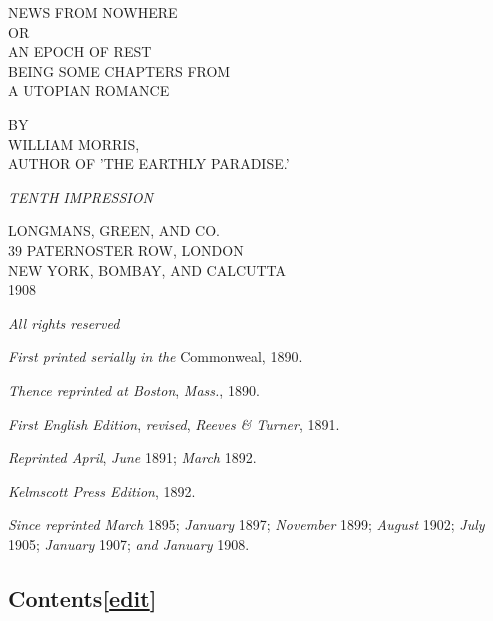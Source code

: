 NEWS FROM NOWHERE\\
OR\\
AN EPOCH OF REST\\
BEING SOME CHAPTERS FROM\\
A UTOPIAN ROMANCE

BY\\
WILLIAM MORRIS,\\
AUTHOR OF 'THE EARTHLY PARADISE.'

\emph{TENTH IMPRESSION}

LONGMANS, GREEN, AND CO.\\
39 PATERNOSTER ROW, LONDON\\
NEW YORK, BOMBAY, AND CALCUTTA\\
1908

\emph{All rights reserved}

\emph{First printed serially in the} Commonweal, 1890.

\emph{Thence reprinted at Boston}, \emph{Mass.}, 1890.

\emph{First English Edition}, \emph{revised}, \emph{Reeves \& Turner},
1891.

\emph{Reprinted April}, \emph{June} 1891; \emph{March} 1892.

\emph{Kelmscott Press Edition}, 1892.

\emph{Since reprinted March} 1895; \emph{January} 1897; \emph{November}
1899; \emph{August} 1902; \emph{July} 1905; \emph{January} 1907;
\emph{and January} 1908.

\hypertarget{contentsedit}{%
\subsection[{{{[}}\href{/w/index.php?title=News_from_Nowhere\&action=edit\&section=1}{edit}{{]}}}]{\texorpdfstring{\protect\hypertarget{Contents}{}{Contents}{{{[}}\href{/w/index.php?title=News_from_Nowhere\&action=edit\&section=1}{edit}{{]}}}}{Contents{[}edit{]}}}\label{contentsedit}}

